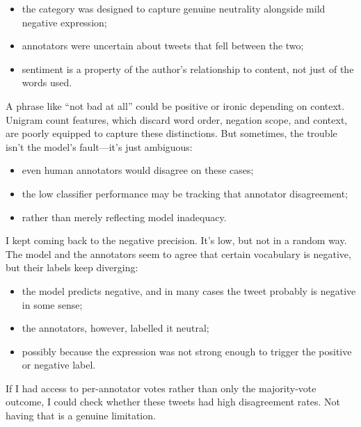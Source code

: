 \documentclass[12pt]{article}
\begin{document}
\begin{itemize}

  \item the category was designed to capture genuine neutrality alongside mild negative expression;

  \item annotators were uncertain about tweets that fell between the two;

  \item sentiment is a property of the author's relationship to content, not just of the words used.

\end{itemize}

A phrase like ``not bad at all'' could be positive or ironic depending on context. Unigram count features, which discard word order, negation scope, and context, are poorly equipped to capture these distinctions. But sometimes, the trouble isn't the model's fault---it's just ambiguous:

\begin{itemize}

  \item even human annotators would disagree on these cases;

  \item the low classifier performance may be tracking that annotator disagreement;

  \item rather than merely reflecting model inadequacy.

\end{itemize}

I kept coming back to the negative precision.
It's low, but not in a random way.
The model and the annotators seem to agree that certain vocabulary is negative, but their labels keep diverging:

\begin{itemize}

  \item the model predicts negative, and in many cases the tweet probably is negative in some sense;

  \item the annotators, however, labelled it neutral;

  \item possibly because the expression was not strong enough to trigger the positive or negative label.

\end{itemize} If I had access to per-annotator votes rather than only the majority-vote outcome, I could check whether these tweets had high disagreement rates. Not having that is a genuine limitation.
\end{document}
